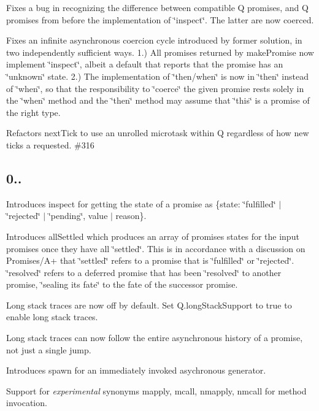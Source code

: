 \begin{DoxyItemize}
\item Fixes a bug in recognizing the difference between compatible Q promises, and Q promises from before the implementation of \char`\"{}inspect\char`\"{}. The latter are now coerced.
\item Fixes an infinite asynchronous coercion cycle introduced by former solution, in two independently sufficient ways. 1.) All promises returned by make\+Promise now implement \char`\"{}inspect\char`\"{}, albeit a default that reports that the promise has an \char`\"{}unknown\char`\"{} state. 2.) The implementation of \char`\"{}then/when\char`\"{} is now in \char`\"{}then\char`\"{} instead of \char`\"{}when\char`\"{}, so that the responsibility to \char`\"{}coerce\char`\"{} the given promise rests solely in the \char`\"{}when\char`\"{} method and the \char`\"{}then\char`\"{} method may assume that \char`\"{}this\char`\"{} is a promise of the right type.
\item Refactors {\ttfamily next\+Tick} to use an unrolled microtask within Q regardless of how new ticks a requested. \#316 
\end{DoxyItemize}

\subsection*{0..}


\begin{DoxyItemize}
\item Introduces {\ttfamily inspect} for getting the state of a promise as {\ttfamily \{state\+: \char`\"{}fulfilled\char`\"{} $\vert$ \char`\"{}rejected\char`\"{} $\vert$ \char`\"{}pending\char`\"{}, value $\vert$ reason\}}.
\item Introduces {\ttfamily all\+Settled} which produces an array of promises states for the input promises once they have all \char`\"{}settled\char`\"{}. This is in accordance with a discussion on Promises/\+A+ that \char`\"{}settled\char`\"{} refers to a promise that is \char`\"{}fulfilled\char`\"{} or \char`\"{}rejected\char`\"{}. \char`\"{}resolved\char`\"{} refers to a deferred promise that has been \char`\"{}resolved\char`\"{} to another promise, \char`\"{}sealing its fate\char`\"{} to the fate of the successor promise.
\item Long stack traces are now off by default. Set {\ttfamily Q.\+long\+Stack\+Support} to true to enable long stack traces.
\item Long stack traces can now follow the entire asynchronous history of a promise, not just a single jump.
\item Introduces {\ttfamily spawn} for an immediately invoked asychronous generator. 
\item Support for {\itshape experimental} synonyms {\ttfamily mapply}, {\ttfamily mcall}, {\ttfamily nmapply}, {\ttfamily nmcall} for method invocation.
\end{DoxyItemize}

